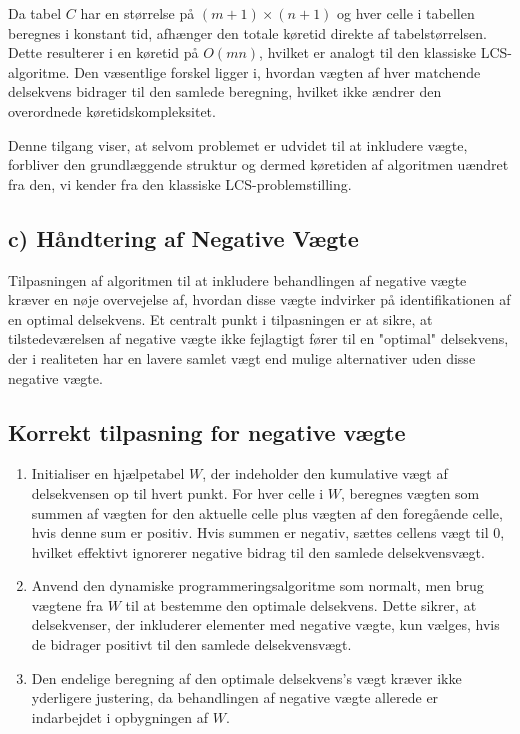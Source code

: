\documentclass{article}
\begin{document}
Da tabel \(C\) har en størrelse på \((m+1) \times (n+1)\) og hver celle i tabellen beregnes i konstant tid, afhænger den totale køretid direkte af tabelstørrelsen. Dette resulterer i en køretid på \(O(mn)\), hvilket er analogt til den klassiske LCS-algoritme. Den væsentlige forskel ligger i, hvordan vægten af hver matchende delsekvens bidrager til den samlede beregning, hvilket ikke ændrer den overordnede køretidskompleksitet.

Denne tilgang viser, at selvom problemet er udvidet til at inkludere vægte, forbliver den grundlæggende struktur og dermed køretiden af algoritmen uændret fra den, vi kender fra den klassiske LCS-problemstilling.


\subsection*{c) Håndtering af Negative Vægte}

Tilpasningen af algoritmen til at inkludere behandlingen af negative vægte kræver en nøje overvejelse af, hvordan disse vægte indvirker på identifikationen af en optimal delsekvens. Et centralt punkt i tilpasningen er at sikre, at tilstedeværelsen af negative vægte ikke fejlagtigt fører til en "optimal" delsekvens, der i realiteten har en lavere samlet vægt end mulige alternativer uden disse negative vægte.

\subsection*{Korrekt tilpasning for negative vægte}

\begin{enumerate}
    \item Initialiser en hjælpetabel \(W\), der indeholder den kumulative vægt af delsekvensen op til hvert punkt. For hver celle i \(W\), beregnes vægten som summen af vægten for den aktuelle celle plus vægten af den foregående celle, hvis denne sum er positiv. Hvis summen er negativ, sættes cellens vægt til 0, hvilket effektivt ignorerer negative bidrag til den samlede delsekvensvægt.
    \item Anvend den dynamiske programmeringsalgoritme som normalt, men brug vægtene fra \(W\) til at bestemme den optimale delsekvens. Dette sikrer, at delsekvenser, der inkluderer elementer med negative vægte, kun vælges, hvis de bidrager positivt til den samlede delsekvensvægt.
    \item Den endelige beregning af den optimale delsekvens's vægt kræver ikke yderligere justering, da behandlingen af negative vægte allerede er indarbejdet i opbygningen af \(W\).
\end{enumerate}
\end{document}
